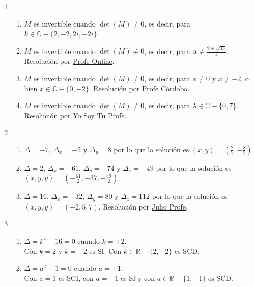 \documentclass[a4paper]{article}
\newcommand{\exercise}{\item}
\begin{document}
\begin{enumerate}
\begin{enumerate} [label=(\alph*)]
		\item $x=2$ o $x=\frac{8}{3}$. Resolución por \href{https://youtu.be/mjS7OMrtNd8}{Mate Profesor Rosado}
		\item $x=\displaystyle\frac{9\pm\sqrt{33}}{4}$. Resolución por \href{https://youtu.be/nJRWcW-m7UU}{Profe Online}
		\item $\lambda=0$, $\lambda=1$ o $\lambda=2$. Resolución por \href{https://youtu.be/YCZd_BWyE0o}{Matemático Compulsivo}
\end{enumerate}\exercise\begin{enumerate} [label=(\alph*)]		\item $M$ es invertible cuando $\det(M)\neq0$, es decir, para $k\in\mathbb{C}-\{2,-2,2i,-2i\}$.
		\item $M$ es invertible cuando $\det(M)\neq0$, es decir, para $\alpha\neq\displaystyle\frac{9\pm\sqrt{33}}{4}$. Resolución por \href{https://youtu.be/nJRWcW-m7UU}{Profe Online}.
		\item $M$ es invertible cuando $\det(M)\neq0$, es decir, para $x\neq0$ y $x\neq-2$, o bien $x\in\mathbb{C}-\{0,-2\}$. Resolución por \href{https://youtu.be/KAt_M122xGw}{Profe Córdoba}.
		\item $M$ es invertible cuando $\det(M)\neq0$, es decir, para $\lambda\in\mathbb{C}-\{0,7\}$. Resolución por \href{https://youtu.be/Q1HjTmvsAGc}{Yo Soy Tu Profe}.
\end{enumerate}\exercise\begin{enumerate} [label=(\alph*)]		\item $\Delta=-7$, $\Delta_x=-2$ y $\Delta_y=8$ por lo que la solución es $(x,y)=\left(\frac{2}{7},-\frac{8}{7}\right)$
		\item $\Delta=2$, $\Delta_x=-61$, $\Delta_y=-74$ y $\Delta_z=-49$ por lo que la solución es $(x,y,y)=\left(-\frac{61}{2},-37,-\frac{49}{2}\right)$
		\item $\Delta=16$, $\Delta_x=-32$, $\Delta_y=80$ y $\Delta_z=112$ por lo que la solución es $(x,y,y)=(-2,5,7)$. Resolución por \href{https://youtu.be/lLPcHVAqY80}{Julio Profe}.
\end{enumerate}\exercise\begin{enumerate} [label=(\alph*)]		\item $\Delta=k^4-16=0$ cuando $k=\pm 2$. \\Con $k=2$ y $k=-2$ es SI. Con $k\in\mathbb{R}-\{2,-2\}$ es SCD.
		\item $\Delta=a^2-1=0$ cuando $a=\pm 1$. \\Con $a=1$ es SCI, con $a=-1$ es SI y con $a\in\mathbb{R}-\{1,-1\}$ es SCD.

\end{enumerate}
\end{enumerate}
\end{document}
